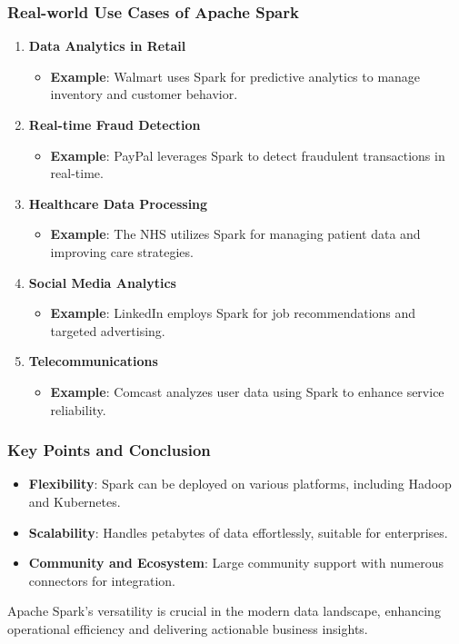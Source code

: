 \documentclass[aspectratio=169]{beamer}
\begin{document}
\begin{frame}[fragile]
    \frametitle{Real-world Use Cases of Apache Spark}
    \begin{enumerate}
        \item \textbf{Data Analytics in Retail}
            \begin{itemize}
                \item \textbf{Example}: Walmart uses Spark for predictive analytics to manage inventory and customer behavior.
            \end{itemize}
        \item \textbf{Real-time Fraud Detection}
            \begin{itemize}
                \item \textbf{Example}: PayPal leverages Spark to detect fraudulent transactions in real-time.
            \end{itemize}
        \item \textbf{Healthcare Data Processing}
            \begin{itemize}
                \item \textbf{Example}: The NHS utilizes Spark for managing patient data and improving care strategies.
            \end{itemize}
        \item \textbf{Social Media Analytics}
            \begin{itemize}
                \item \textbf{Example}: LinkedIn employs Spark for job recommendations and targeted advertising.
            \end{itemize}
        \item \textbf{Telecommunications}
            \begin{itemize}
                \item \textbf{Example}: Comcast analyzes user data using Spark to enhance service reliability.
            \end{itemize}
    \end{enumerate}
\end{frame}

\begin{frame}[fragile]
    \frametitle{Key Points and Conclusion}
    \begin{itemize}
        \item \textbf{Flexibility}: Spark can be deployed on various platforms, including Hadoop and Kubernetes.
        \item \textbf{Scalability}: Handles petabytes of data effortlessly, suitable for enterprises.
        \item \textbf{Community and Ecosystem}: Large community support with numerous connectors for integration.
    \end{itemize}
    Apache Spark's versatility is crucial in the modern data landscape, enhancing operational efficiency and delivering actionable business insights.
\end{frame}
\end{document}
